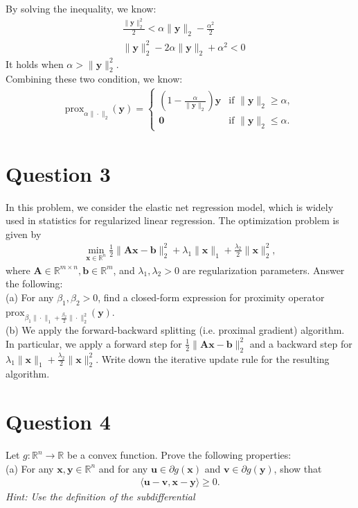 \documentclass{article}
\newcommand{\R}{\mathbb{R}}
\begin{document}
By solving the inequality, we know:
\begin{align*}
    &\frac{\|\bm{y}\|_2^2}{2} <  \alpha\|\bm{y}\|_2 - \frac{\alpha^2}{2} \\
    &\|\bm{y}\|_2^2 - 2\alpha\|\bm{y}\|_2 + \alpha^2 < 0
\end{align*}
It holds when \(\alpha > \|\bm{y}\|_2^2\).  \\
Combining these two condition, we know:
\begin{align*}
    \text{prox}_{\alpha \|\cdot\|_2}(\bm{y}) = \begin{cases}
        \left(1 - \frac{\alpha}{\|\bm{y}\|_2} \right)\bm{y} &\text{if }\|\bm{y}\|_2 \geq \alpha, \\
        \bm{0} &\text{if } \|\bm{y}\|_2 \leq \alpha.
    \end{cases}
\end{align*}








\section*{Question 3}
In this problem, we consider the elastic net regression model, which is widely used in statistics for regularized linear regression. The optimization problem is given by
\begin{align*}
    \min_{\bm{x}\in\R^n} \frac{1}{2} \|\bm{A}\bm{x} - \bm{b}\|_2^2 + \lambda_1\|\bm{x}\|_1 + \frac{\lambda_2}{2}\|\bm{x}\|_2^2,
\end{align*}
where \(\bm{A} \in \R^{m \times n}, \bm{b} \in \R^m\), and \(\lambda_1, \lambda_2 > 0\) are regularization parameters. Answer the following: \\
(a) For any \(\beta_1, \beta_2 > 0\), find a closed-form expression for proximity operator \(\text{prox}_{\beta_1\|\cdot\|_1 + \frac{\beta_2}{2}\|\cdot\|_2^2}(\bm{y})\). \\
(b) We apply the forward-backward splitting (i.e. proximal gradient) algorithm. In particular, we apply a forward step for \(\frac{1}{2} \|\bm{A}\bm{x} - \bm{b}\|_2^2\) and a backward step for \(\lambda_1\|\bm{x}\|_1 + \frac{\lambda_2}{2}\|\bm{x}\|_2^2\). Write down the iterative update rule for the resulting algorithm.


\section*{Question 4}
Let \(g: \R^n \to \R\) be a convex function. Prove the following properties: \\
(a) For any \(\bm{x}, \bm{y} \in \R^n\) and for any \(\bm{u} \in \partial g(\bm{x})\) and \(\bm{v} \in \partial g(\bm{y})\), show that
\begin{align*}
    \langle \bm{u} - \bm{v}, \bm{x} - \bm{y}\rangle \geq 0.
\end{align*}
\textit{Hint: Use the definition of the subdifferential}
\end{document}
